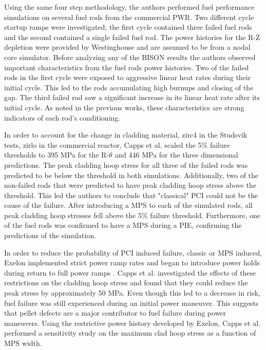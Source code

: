 \documentclass[edeposit,fullpage,11pt]{uiucthesis2009}
\begin{document}
Using the same four step methodology, the authors performed fuel performance simulations on several fuel rods from the commercial \gls{PWR}.
Two different cycle startup ramps were investigated; the first cycle contained three failed fuel rods and the second contained a single failed fuel rod.
The power histories for the R-Z depletion were provided by Westinghouse and are assumed to be from a nodal core simulator.
Before analyzing any of the BISON results the authors observed important characteristics from the fuel rods power histories.
Two of the failed rods in the first cycle were exposed to aggressive linear heat rates during their initial cycle.
This led to the rods accumulating high burnups and  closing of the gap.
The third failed rod saw a significant increase in its linear heat rate after its initial cycle.
As noted in the previous works, these characteristics are strong indicators of each rod's conditioning.

In order to account for the change in cladding material, zirc4 in the Studsvik tests, zirlo in the commercial reactor, Capps et al. scaled the 5\% failure thresholds to 395 MPa for the R-$\theta$ and 446 MPa for the three dimensional predictions.
The peak cladding hoop stress for all three of the failed rods was predicted to be below the threshold in both simulations.
Additionally, two of the non-failed rods that were predicted to have peak cladding hoop stress above the threshold. 
This led the authors to conclude that "classical" \gls{PCI} could not be the cause of the failure.
After introducing a \gls{MPS} to each of the simulated rods, all peak cladding hoop stresses fell above the 5\% failure threshold.
Furthermore, one of the fuel rods was confirmed to have a \gls{MPS} during a \gls{PIE}, confirming the predictions of the simulation.

In order to reduce the probability of \gls{PCI} induced failure, classic or \gls{MPS} induced, Exelon implemented strict power ramp rates and began to introduce power holds during return to full power ramps \cite{capps_pci_2017}.
Capps et al. investigated the effects of these restrictions on the cladding hoop stress and found that they could reduce the peak stress by approximately 50 MPa.
Even though this led to a decrease in risk, fuel failure was still experienced during an initial power maneuver.
This suggests that pellet defects are a major contributor to fuel failure during power maneuvers. 
Using the restrictive power history developed by Exelon, Capps et al. performed a sensitivity study on the maximum clad hoop stress as a function of \gls{MPS} width.
\end{document}
